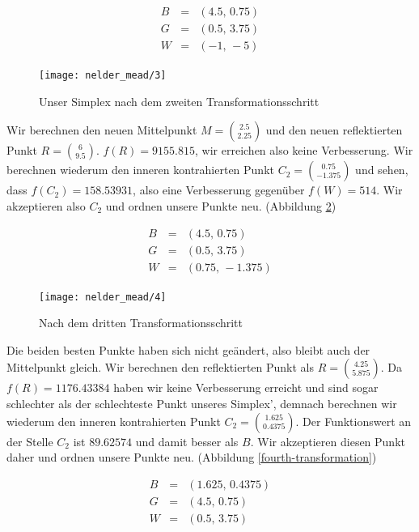 \documentclass[naustrian]{article}
\begin{document}
{\begin{eqnarray*}
    B & = & (4.5, \, 0.75)\\
    G & = & (0.5,\,3.75)\\
    W & = & (-1,\,-5)
\end{eqnarray*}

\begin{figure}[h]
    \centering
    \texttt{[image: nelder\_mead/3]}
    \caption{Unser Simplex nach dem zweiten Transformationsschritt}
    \label{second-transformation}
\end{figure}

Wir berechnen den neuen Mittelpunkt $M = \binom{2.5}{2.25}$ und den neuen
reflektierten Punkt $R = \binom{6}{9.5}$. $f(R) = 9155.815$, wir erreichen also
keine Verbesserung. Wir berechnen wiederum den inneren kontrahierten Punkt
$C_{2} = \binom{0.75}{-1.375}$ und sehen, dass $f(C_{2}) = 158.53931$, also
eine Verbesserung gegenüber $f(W) = 514$. Wir akzeptieren also $C_{2}$ und
ordnen unsere Punkte neu. (Abbildung \ref{third-transformation})

\begin{eqnarray*}
    B & = & (4.5, \, 0.75)\\
    G & = & (0.5,\,3.75)\\
    W & = & (0.75,\,-1.375)
\end{eqnarray*}

\begin{figure}[h]
    \centering
    \texttt{[image: nelder\_mead/4]}
    \caption{Nach dem dritten Transformationsschritt}
    \label{third-transformation}
\end{figure}

Die beiden besten Punkte haben sich nicht geändert, also bleibt auch der
Mittelpunkt gleich. Wir berechnen den reflektierten Punkt als $R =
\binom{4.25}{5.875}$. Da $f(R) = 1176.43384$ haben wir keine Verbesserung
erreicht und sind sogar schlechter als der schlechteste Punkt unseres Simplex',
demnach berechnen wir wiederum den inneren kontrahierten Punkt $C_{2} =
\binom{1.625}{0.4375}$. Der Funktionswert an der Stelle $C_{2}$ ist $89.62574$
und damit besser als $B$. Wir akzeptieren diesen Punkt daher und ordnen unsere
Punkte neu. (Abbildung \ref{fourth-transformation})

\begin{eqnarray*}
    B & = & (1.625,\,0.4375)\\
    G & = & (4.5, \, 0.75)\\
    W & = & (0.5,\,3.75)
\end{eqnarray*}

}
\end{document}
